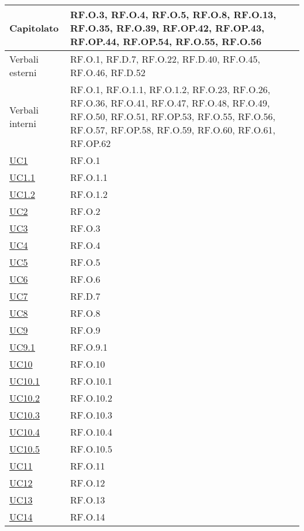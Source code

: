 \begin{adjustwidth}{-0.5cm}{-0.5cm}
\begin{longtable}{|P{4,5cm}|>{\arraybackslash}P{9cm}|}
    Capitolato & RF.O.3, RF.O.4, RF.O.5, RF.O.8, RF.O.13, RF.O.35, RF.O.39, RF.OP.42, RF.OP.43, RF.OP.44, RF.OP.54, RF.O.55, RF.O.56 \\
    \hline
    Verbali esterni & RF.O.1, RF.D.7, RF.O.22, RF.D.40, RF.O.45, RF.O.46, RF.D.52 \\
    \hline
    Verbali interni & RF.O.1, RF.O.1.1, RF.O.1.2, RF.O.23, RF.O.26, RF.O.36, RF.O.41, RF.O.47, RF.O.48, RF.O.49, RF.O.50, RF.O.51, RF.OP.53, RF.O.55, RF.O.56, RF.O.57, RF.OP.58, RF.O.59, RF.O.60, RF.O.61, RF.OP.62 \\
    \hline
    \hyperref[UC1]{UC1} & RF.O.1 \\
    \hline
    \hyperref[UC1point1]{UC1.1} & RF.O.1.1 \\
    \hline
    \hyperref[UC1point2]{UC1.2} & RF.O.1.2 \\
    \hline
    \hyperref[UC2]{UC2} & RF.O.2 \\
    \hline
    \hyperref[UC3]{UC3} & RF.O.3 \\
    \hline
    \hyperref[UC4]{UC4} & RF.O.4 \\
    \hline
    \hyperref[UC5]{UC5} & RF.O.5 \\
    \hline
    \hyperref[UC6]{UC6} & RF.O.6 \\
    \hline
    \hyperref[UC7]{UC7} & RF.D.7 \\
    \hline
    \hyperref[UC8]{UC8} & RF.O.8 \\
    \hline
    \hyperref[UC9]{UC9} & RF.O.9 \\
    \hline
    \hyperref[UC9point1]{UC9.1} & RF.O.9.1 \\
    \hline
    \hyperref[UC10]{UC10} & RF.O.10 \\
    \hline
    \hyperref[UC10point1]{UC10.1} & RF.O.10.1 \\ 
    \hline
    \hyperref[UC10point2]{UC10.2} & RF.O.10.2\\
    \hline
    \hyperref[UC10point3]{UC10.3} & RF.O.10.3\\
    \hline
    \hyperref[UC10point4]{UC10.4} & RF.O.10.4\\
    \hline
    \hyperref[UC10point5]{UC10.5} & RF.O.10.5\\
    \hline
    \hyperref[UC11]{UC11} & RF.O.11 \\
    \hline
    \hyperref[UC12]{UC12} & RF.O.12 \\
    \hline
    \hyperref[UC13]{UC13} & RF.O.13 \\
    \hline
    \hyperref[UC14]{UC14} & RF.O.14 \\

\end{longtable}
\end{adjustwidth}
